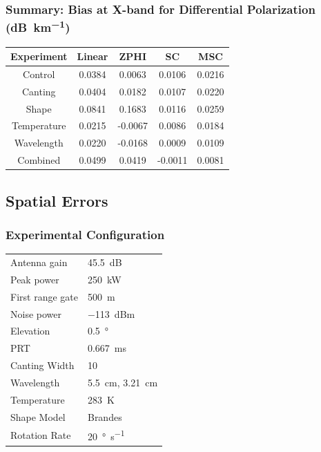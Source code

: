 \documentclass[red]{beamer}
\begin{document}
\begin{frame}
    \frametitle{Summary: Bias at X-band for Differential Polarization (\si{dB\per \kilo\meter})}
    \begin{center}
        \begin{tabular}{| c | c | c | c | c |}
            \hline
            Experiment & Linear & ZPHI & SC & MSC \\
            \hline
            \hline
            Control & 0.0384 & 0.0063 & 0.0106 & 0.0216 \\
            Canting & 0.0404 & 0.0182 & 0.0107 & 0.0220 \\
            Shape & 0.0841 & 0.1683 & 0.0116 & 0.0259 \\
            Temperature & 0.0215 & -0.0067 & 0.0086 & 0.0184 \\
            Wavelength & 0.0220 & -0.0168 & 0.0009 & 0.0109 \\
            Combined & 0.0499 & 0.0419 & -0.0011 & 0.0081 \\
            \hline
        \end{tabular}
    \end{center}
\end{frame}

\subsection{Spatial Errors}
\begin{frame}
	\frametitle{Experimental Configuration}
	\begin{center}
	    \begin{tabular}{ | l | l | }
	        \hline
	        Antenna gain & \SI{45.5}{dB} \\
	        Peak power & \SI{250}{\kilo\watt} \\
	        First range gate & \SI{500}{\meter} \\
	        Noise power & \SI{-113}{dBm} \\
	        Elevation & \SI{0.5}{\degree} \\
	        PRT & \SI{0.667}{\milli\second} \\
	        Canting Width & \num{10} \\
	        Wavelength & \SI{5.5}{\centi\meter}, \SI{3.21}{\centi\meter} \\
	        Temperature & \SI{283}{\kelvin} \\
	        Shape Model & Brandes \\
	        Rotation Rate & \SI{20}{\degree\per\second} \\
	        \hline
	    \end{tabular}
	\end{center}
\end{frame}
\end{document}
